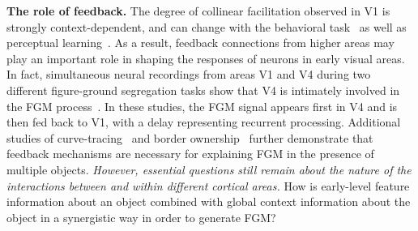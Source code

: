 \documentclass[11pt,notitlepage]{article}
\begin{document}

\textbf{The role of feedback.}  The degree of collinear facilitation
observed in V1 is strongly context-dependent, and can change with the
behavioral task~\citep{Li_etal04, Li_etal06} as well as perceptual
learning~\citep{Li_Gilbert_etal08}.
As a result, feedback connections from higher areas
may play an important role in shaping the responses of neurons in
early visual areas. In fact, simultaneous neural recordings from areas
V1 and V4 during two different figure-ground segregation tasks show
that V4 is intimately involved in the FGM process~\citep{Poort_etal12,
  Chen_etal14}. In these studies, the FGM signal appears first in V4
and is then fed back to V1, with a delay representing recurrent
processing. Additional studies of
curve-tracing~\citep{Roelfsema_etal98} and border
ownership~\citep{Zhou_etal00, Qiu_etal07, Zhang_vonderHeydt10} further
demonstrate that feedback mechanisms are necessary for explaining FGM
in the presence of multiple objects. \textit{However, essential
  questions still remain about the nature of the interactions between
  and within different cortical areas.} How
    is early-level feature information about an object combined with
    global context information about the object in a synergistic way
    in order to generate FGM?
\end{document}
